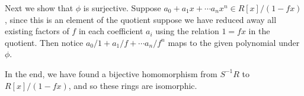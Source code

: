 \documentclass[12pt,letterpaper,boxed]{hmcpset}
\newcommand{\inv}{^{-1}}
\begin{document}
\begin{solution}
Next we show that $\phi$ is surjective. Suppose
$a_0 + a_1x + \cdots a_nx^n \in R[x]/(1-fx)$, since this is an element
of the quotient suppose we have reduced away all existing factors of
$f$ in each coefficient $a_i$ using the relation $1 = fx$ in the
quotient.
Then notice $a_0/1 +
a_1/f + \cdots a_n/f^n$ maps to the given polynomial under $\phi$.

In the end, we have found a bijective homomorphism from $S\inv R$ to
$R[x]/(1-fx)$, and so these rings are isomorphic. 
\end{solution}

\newpage

\begin{problem}[4]
	\hfill
\end{problem}

\begin{solution}
\end{solution}

\newpage


\begin{problem}[4]
	\hfill
\end{problem}

\begin{solution}
\end{solution}

\newpage


\begin{problem}[4]
	\hfill
\end{problem}

\begin{solution}
\end{solution}

\newpage
\end{document}
